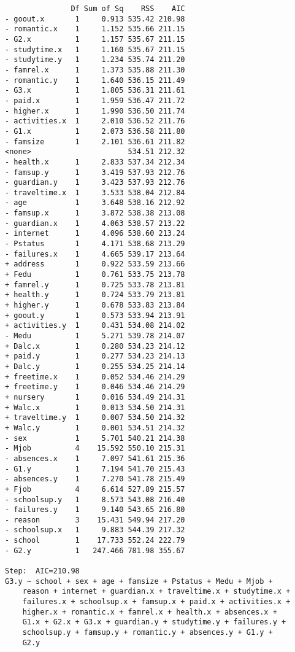 \documentclass[11pt]{article}
\begin{document}
\begin{enumerate}
\begin{verbatim}
               Df Sum of Sq    RSS    AIC
- goout.x       1     0.913 535.42 210.98
- romantic.x    1     1.152 535.66 211.15
- G2.x          1     1.157 535.67 211.15
- studytime.x   1     1.160 535.67 211.15
- studytime.y   1     1.234 535.74 211.20
- famrel.x      1     1.373 535.88 211.30
- romantic.y    1     1.640 536.15 211.49
- G3.x          1     1.805 536.31 211.61
- paid.x        1     1.959 536.47 211.72
- higher.x      1     1.990 536.50 211.74
- activities.x  1     2.010 536.52 211.76
- G1.x          1     2.073 536.58 211.80
- famsize       1     2.101 536.61 211.82
<none>                      534.51 212.32
- health.x      1     2.833 537.34 212.34
- famsup.y      1     3.419 537.93 212.76
- guardian.y    1     3.423 537.93 212.76
- traveltime.x  1     3.533 538.04 212.84
- age           1     3.648 538.16 212.92
- famsup.x      1     3.872 538.38 213.08
- guardian.x    1     4.063 538.57 213.22
- internet      1     4.096 538.60 213.24
- Pstatus       1     4.171 538.68 213.29
- failures.x    1     4.665 539.17 213.64
+ address       1     0.922 533.59 213.66
+ Fedu          1     0.761 533.75 213.78
+ famrel.y      1     0.725 533.78 213.81
+ health.y      1     0.724 533.79 213.81
+ higher.y      1     0.678 533.83 213.84
+ goout.y       1     0.573 533.94 213.91
+ activities.y  1     0.431 534.08 214.02
- Medu          1     5.271 539.78 214.07
+ Dalc.x        1     0.280 534.23 214.12
+ paid.y        1     0.277 534.23 214.13
+ Dalc.y        1     0.255 534.25 214.14
+ freetime.x    1     0.052 534.46 214.29
+ freetime.y    1     0.046 534.46 214.29
+ nursery       1     0.016 534.49 214.31
+ Walc.x        1     0.013 534.50 214.31
+ traveltime.y  1     0.007 534.50 214.32
+ Walc.y        1     0.001 534.51 214.32
- sex           1     5.701 540.21 214.38
- Mjob          4    15.592 550.10 215.31
- absences.x    1     7.097 541.61 215.36
- G1.y          1     7.194 541.70 215.43
- absences.y    1     7.270 541.78 215.49
+ Fjob          4     6.614 527.89 215.57
- schoolsup.y   1     8.573 543.08 216.40
- failures.y    1     9.140 543.65 216.80
- reason        3    15.431 549.94 217.20
- schoolsup.x   1     9.883 544.39 217.32
- school        1    17.733 552.24 222.79
- G2.y          1   247.466 781.98 355.67

Step:  AIC=210.98
G3.y ~ school + sex + age + famsize + Pstatus + Medu + Mjob + 
    reason + internet + guardian.x + traveltime.x + studytime.x + 
    failures.x + schoolsup.x + famsup.x + paid.x + activities.x + 
    higher.x + romantic.x + famrel.x + health.x + absences.x + 
    G1.x + G2.x + G3.x + guardian.y + studytime.y + failures.y + 
    schoolsup.y + famsup.y + romantic.y + absences.y + G1.y + 
    G2.y


\end{verbatim}
\end{enumerate}
\end{document}
